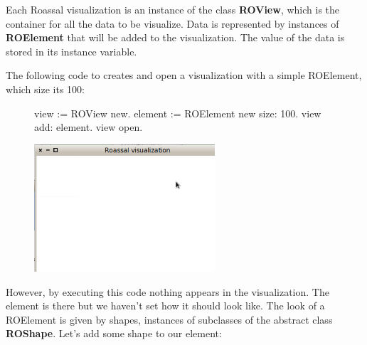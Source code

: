 \documentclass[a4paper,10pt,twoside]{book}
\begin{document}
Each Roassal visualization is an instance of the class \textbf{ROView}, which is the container for all the data to be visualize.
Data is represented by instances of \textbf{ROElement} that will be added to the visualization. The value of the data is stored in its  instance variable.

The following code to creates and open a visualization with a simple ROElement, which size its 100:



\begin{figure}[H]
      \begin{minipage}[t]{0.5\textwidth}
      \vspace{0pt}
\begin{code}{}
view := ROView new.
element := 
	ROElement new size: 100.
view add: element.
view open.
\end{code}
   \end{minipage}
   \hfill
   \begin{minipage}[t]{0.6\textwidth}
      \vspace{0pt} \raggedright
       \centering
		\includegraphics[width=0.6\textwidth]{ex1}
   \end{minipage}
\label{fig:ex1}
\end{figure}

However, by executing this code nothing appears in the visualization. The element is there but we haven't set how it should look like. The look of a ROElement is given by shapes, instances of subclasses of the abstract class \textbf{ROShape}. Let's add some shape to our element:
\end{document}
